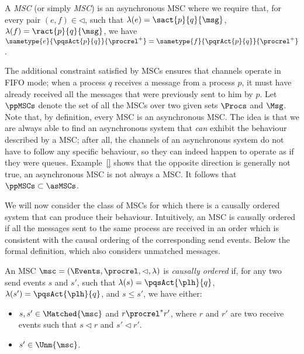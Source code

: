 \begin{definition}
A \emph{\pp MSC} (or simply \emph{MSC}) is an asynchronous MSC where we require that, for every pair $(e,f) \in {\lhd}$, such that $\lambda(e) = \sact{p}{q}{\msg}$, $\lambda(f) = \ract{p}{q}{\msg}$, we have $\sametype{e}{\pqsAct{p}{q}}{\procrel^+} = \sametype{f}{\pqrAct{p}{q}}{\procrel^+}$.
\end{definition}

The additional constraint satisfied by \pp MSCs ensures that channels operate in FIFO mode; when a process $q$ receives a message from a process $p$, it must have already received all the messages that were previously sent to him by $p$. Let $\ppMSCs$ denote the set of all the \pp MSCs over two given sets $\Procs$ and $\Msg$. Note that, by definition, every \pp MSC is an asynchronous MSC. The idea is that we are always able to find an asynchronous system that \emph{can} exhibit the behaviour described by a \pp MSC; after all, the channels of an asynchronous system do not have to follow any specific behaviour, so they can indeed happen to operate as if they were queues. Example~\ref{} shows that the opposite direction is generally not true, an asynchronous MSC is not always a \pp MSC. It follows that $\ppMSCs \subset \asMSCs$.

\medskip

We will now consider the class of MSCs for which there is a causally ordered system that can produce their behaviour. Intuitively, an MSC is causally ordered if all the messages sent to the same process are received in an order which is consistent with the causal ordering of the corresponding send events. Below the formal definition, which also considers unmatched messages.
\begin{definition}
An MSC $\msc = (\Events,\procrel,\lhd,\lambda)$ is \emph{causally ordered} if, for any two send events $s$ and $s'$, such that $\lambda(s)=\pqsAct{\plh}{q}$, $\lambda(s')=\pqsAct{\plh}{q}$, and $s \le s'$, we have either:
\begin{itemize}\itemsep=0.5ex
	\item $s,s' \in \Matched{\msc}$ and $r \procrel^* r'$, where $r$ and $r'$ are two receive events such that $s \lhd r$ and $s' \lhd r'$.
	\item $s' \in \Unm{\msc}$.
\end{itemize}
\end{definition}

